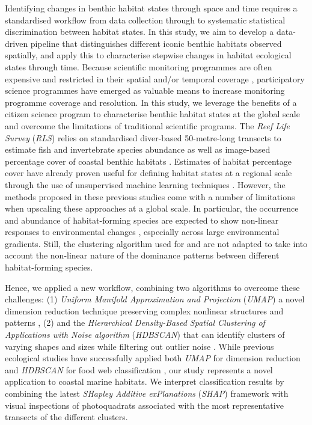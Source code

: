 \begin{refsection}
Identifying changes in benthic habitat states through space and time
requires a standardised workflow from data collection through to
systematic statistical discrimination between habitat states. In this
study, we aim to develop a data-driven pipeline that distinguishes
different iconic benthic habitats observed spatially, and apply this to
characterise stepwise changes in habitat ecological states through time.
Because scientific monitoring programmes are often expensive
\autocite{Edgar_2016} and restricted in their spatial and/or temporal
coverage \autocite{Rhodes_2015}, participatory science programmes have
emerged as valuable means to increase monitoring programme coverage and
resolution. In this study, we leverage the benefits of a citizen science
program to characterise benthic habitat states at the global scale and
overcome the limitations of traditional scientific programs. The
\emph{Reef Life Survey} (\emph{RLS}) relies on standardised diver-based
50-metre-long transects to estimate fish and invertebrate species
abundance as well as image-based percentage cover of coastal benthic
habitats \autocite{Edgar_2014b}. Estimates of habitat percentage cover
have already proven useful for defining habitat states at a regional
scale through the use of unsupervised machine learning techniques
\autocites[ ]{Cresswell_2017}{PelletierD_2020}. However, the methods
proposed in these previous studies come with a number of limitations
when upscaling these approaches at a global scale. In particular, the
occurrence and abundance of habitat-forming species are expected to show
non-linear responses to environmental changes \autocite{Oksanen_2002},
especially across large environmental gradients. Still, the clustering
algorithm used for \textcite{Cresswell_2017} and
\textcite{PelletierD_2020} are not adapted to take into account the
non-linear nature of the dominance patterns between different
habitat-forming species.

Hence, we applied a new workflow, combining two algorithms to overcome
these challenges: (1) \emph{Uniform Manifold Approximation and
Projection} (\emph{UMAP}) a novel dimension reduction technique
preserving complex nonlinear structures and patterns
\autocite{McInnes_2020}, (2) and the \emph{Hierarchical Density-Based
Spatial Clustering of Applications with Noise algorithm}
(\emph{HDBSCAN}) that can identify clusters of varying shapes and sizes
while filtering out outlier noise \autocites[
]{Campello_2013}{McInnes2017}. While previous ecological studies have
successfully applied both \emph{UMAP} for dimension reduction
\autocite{Milosevic_2022} and \emph{HDBSCAN} for food web classification
\autocite{Ohlsson_2020}, our study represents a novel application to
coastal marine habitats. We interpret classification results by
combining the latest \emph{SHapley Additive exPlanations} (\emph{SHAP})
\autocite{Lundberg_2017} framework with visual inspections of
photoquadrats associated with the most representative transects of the
different clusters.


\end{refsection}

